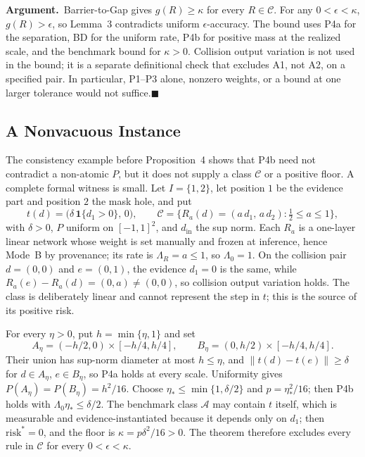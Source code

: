 \documentclass[twoside,11pt]{article}
\newcommand{\argument}{\par\medskip\noindent\textbf{Argument.}\ }
\newcommand{\qedbox}{\hfill$\blacksquare$}
\begin{document}
\argument Barrier-to-Gap gives $g(R)\geq\kappa$ for every $R\in\mathcal{C}$. For any $0<\epsilon<\kappa$, $g(R)>\epsilon$, so Lemma~3 contradicts uniform $\epsilon$-accuracy. The bound uses P4a for the separation, BD for the uniform rate, P4b for positive mass at the realized scale, and the benchmark bound for $\kappa>0$. Collision output variation is not used in the bound; it is a separate definitional check that excludes A1, not A2, on a specified pair. In particular, P1--P3 alone, nonzero weights, or a bound at one larger tolerance would not suffice.\qedbox

\subsection{A Nonvacuous Instance}
\label{sec:instance}%

The consistency example before Proposition~4 shows that P4b need not contradict a non-atomic $P$, but it does not supply a class $\mathcal{C}$ or a positive floor. A complete formal witness is small. Let $I=\{1,2\}$, let position $1$ be the evidence part and position $2$ the mask hole, and put
\begin{equation}
t(d)=\bigl(\delta\,\mathbf{1}\{d_1>0\},\,0\bigr),
\qquad
\mathcal{C}=\bigl\{R_a(d)=(a\,d_1,\,a\,d_2): \tfrac12\le a\le 1\bigr\},
\label{eq:witness}%
\end{equation}
with $\delta>0$, $P$ uniform on $[-1,1]^2$, and $d_{\mathrm{in}}$ the sup norm. Each $R_a$ is a one-layer linear network whose weight is set manually and frozen at inference, hence Mode~B by provenance; its rate is $\Lambda_R=a\le 1$, so $\Lambda_0=1$. On the collision pair $d=(0,0)$ and $e=(0,1)$, the evidence $d_1=0$ is the same, while $R_a(e)-R_a(d)=(0,a)\neq(0,0)$, so collision output variation holds. The class is deliberately linear and cannot represent the step in $t$; this is the source of its positive risk.

For every $\eta>0$, put $h=\min\{\eta,1\}$ and set
\[
A_\eta=(-h/2,0)\times[-h/4,h/4],
\qquad
B_\eta=(0,h/2)\times[-h/4,h/4].
\]
Their union has sup-norm diameter at most $h\le\eta$, and $\|t(d)-t(e)\|\ge\delta$ for $d\in A_\eta$, $e\in B_\eta$, so P4a holds at every scale. Uniformity gives $P(A_\eta)=P(B_\eta)=h^2/16$. Choose $\eta_*\le\min\{1,\delta/2\}$ and $p=\eta_*^2/16$; then P4b holds with $\Lambda_0\eta_*\le\delta/2$. The benchmark class $\mathcal{A}$ may contain $t$ itself, which is measurable and evidence-instantiated because it depends only on $d_1$; then $\mathrm{risk}^*=0$, and the floor is $\kappa=p\delta^2/16>0$. The theorem therefore excludes every rule in $\mathcal{C}$ for every $0<\epsilon<\kappa$.
\end{document}
